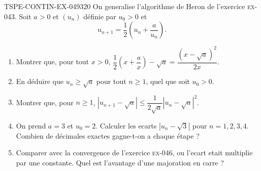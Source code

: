 \begin{exercice}{TSPE-CONTIN-EX-049}{3}{20}
On generalise l'algorithme de Heron de l'exercice \textsc{ex-043}. Soit $a > 0$ et $(u_n)$ définie par $u_0 > 0$ et
\[ u_{n+1} = \frac{1}{2}\left(u_n + \frac{a}{u_n}\right). \]
\begin{enumerate}
  \item Montrer que, pour tout $x > 0$, $\dfrac{1}{2}\left(x + \dfrac{a}{x}\right) - \sqrt a = \dfrac{\left(x - \sqrt a\right)^2}{2x}$.
  \item En déduire que $u_n \geq \sqrt a$ pour tout $n \geq 1$, quel que soit $u_0 > 0$.
  \item Montrer que, pour $n \geq 1$, $\left|u_{n+1} - \sqrt a\right| \leq \dfrac{1}{2\sqrt a}\left|u_n - \sqrt a\right|^2$.
  \item On prend $a = 3$ et $u_0 = 2$. Calculer les ecarts $\left|u_n - \sqrt3\right|$ pour $n = 1, 2, 3, 4$. Combien de décimales exactes gagne-t-on a chaque étape ?
  \item Comparer avec la convergence de l'exercice \textsc{ex-046}, ou l'ecart etait multiplie par une constante. Quel est l'avantage d'une majoration en carre ?
\end{enumerate}
\end{exercice}
